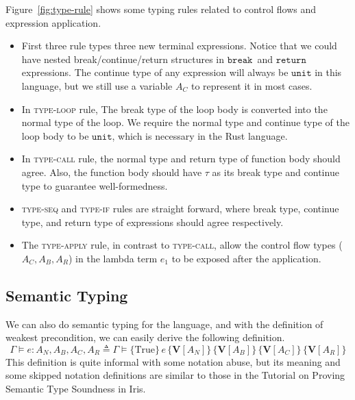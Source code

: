 \documentclass{article}
\numberwithin{algorithm}{section}
\newcommand{\progspec}[1]{\{ #1 \}}
\newcommand{\cmdbreak}{\texttt{break}\,}
\newcommand{\cmdreturn}{\texttt{return}\,}
\newcommand{\tunit}{\texttt{unit}}
\newcommand{\vtype}[1]{\textbf{V}[#1]}
\newcommand{\htriple}[6]{\progspec{#1}\, #2\, \progspec{#3}\, \progspec{#4}\, \progspec{#5}\, \progspec{#6}}
\begin{document}
Figure~\ref{fig:type-rule} shows some typing rules related to control flows and expression application.
\begin{itemize}
    \item First three rule types three new terminal expressions. Notice that we could have nested break/continue/return structures in $\cmdbreak\!$ and $\cmdreturn\!$ expressions. The continue type of any expression will always be $\tunit$ in this language, but we still use a variable $A_C$ to represent it in most cases.
    \item In \textsc{type-loop} rule, The break type of the loop body is converted into the normal type of the loop. We require the normal type and continue type of the loop body to be $\tunit$, which is necessary in the Rust language.
    \item In \textsc{type-call} rule, the normal type and return type of function body should agree. Also, the function body should have $\tau$ as its break type and continue type to guarantee well-formedness.
    \item \textsc{type-seq} and \textsc{type-if} rules are straight forward, where break type, continue type, and return type of expressions should agree respectively.
    \item The \textsc{type-apply} rule, in contrast to \textsc{type-call}, allow the control flow types ($A_C, A_B, A_R$) in the lambda term $e_1$ to be exposed after the application.
\end{itemize}


\subsection{Semantic Typing}

We can also do semantic typing for the language, and with the definition of weakest precondition, we can easily derive the following definition.
$$
\Gamma \vDash e: A_N, A_B, A_C, A_R \triangleq \Gamma \vDash \htriple{\text{True}}{e}{\vtype{A_N}}{\vtype{A_B}}{\vtype{A_C}}{\vtype{A_R}}
$$
This definition is quite informal with some notation abuse, but its meaning and some skipped notation definitions are similar to those in the Tutorial on Proving Semantic Type Soundness in Iris.
\end{document}
